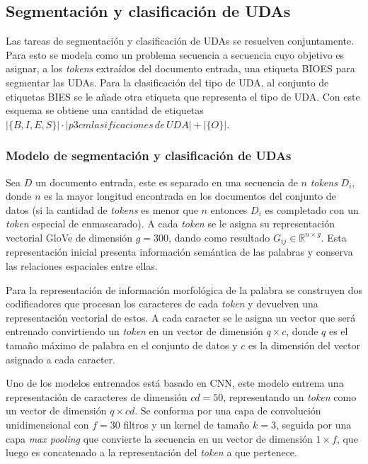 \documentclass{rcci} %
\begin{document}
\subsection*{Segmentaci\'on y clasificaci\'on de UDAs}

Las tareas de segmentaci\'on y clasificaci\'on de UDAs se resuelven conjuntamente. Para esto se modela 
como un problema secuencia a secuencia cuyo objetivo es asignar, a los \textit{tokens} extra\'idos del documento 
entrada, una etiqueta BIOES para segmentar las UDAs. Para la clasificaci\'on del tipo 
de UDA, al conjunto de etiquetas BIES se le a\~nade otra etiqueta que representa el tipo de UDA. Con 
este esquema se obtiene una cantidad de etiquetas $|\{B,I,E,S\}| \cdot |p{3cm}lasificaciones \, de \, UDA| + |\{O\}|$.

\subsubsection*{Modelo de segmentaci\'on y clasificaci\'on de UDAs}\label{ssec:segm_clsf_uda}

Sea $D$ un documento entrada, este es separado en una secuencia de $n$ \textit{tokens} $D_i$, donde $n$ es la mayor longitud encontrada
en los documentos del conjunto de datos (si la cantidad de \textit{tokens} es menor que $n$ entonces $D_i$ es completado con un \textit{token} especial de enmascarado). 
A cada \textit{token} se le asigna
su representaci\'on vectorial GloVe de dimensi\'on $g=300$, dando como resultado $G_{ij} \in \mathbb{R}^{n \times g}$.
Esta representaci\'on inicial presenta informaci\'on sem\'antica de las palabras y conserva las relaciones 
espaciales entre ellas. 

Para la representaci\'on de informaci\'on morfol\'ogica de la palabra se construyen dos
codificadores que procesan los caracteres de cada \textit{token} y devuelven una representaci\'on vectorial de estos.
A cada caracter se le asigna un vector que ser\'a entrenado convirtiendo un \textit{token} en un vector de dimensi\'on
$q \times c$, donde $q$ es el tama\~no m\'aximo de palabra en el conjunto de datos y $c$ es la dimensi\'on del vector
asignado a cada caracter.

Uno de los modelos entrenados est\'a basado en CNN, este modelo entrena una representaci\'on de caracteres de dimensi\'on
$cd=50$, representando un \textit{token} como un vector de dimensi\'on $q \times cd$. Se conforma por una capa de convoluci\'on unidimensional
con $f=30$ filtros y un kernel de tama\~no $k=3$, seguida por una capa \textit{max pooling} que convierte la secuencia en un vector
de dimensi\'on $1 \times f$, que luego es concatenado a la representaci\'on del \textit{token} a que pertenece.
\end{document}
